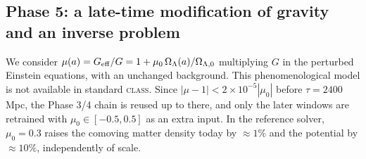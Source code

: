 \subsection{Phase 5: a late-time modification of gravity and an inverse problem}\label{sec:phase5}
We consider $\mu(a)=G_{\rm eff}/G=1+\mu_0\,\Omega_\Lambda(a)/\Omega_{\Lambda,0}$ multiplying $G$ in the perturbed Einstein equations, with an unchanged background. This phenomenological model is not available in standard \textsc{class}. Since $|\mu-1|<2\times10^{-5}|\mu_0|$ before $\tau=2400$\,Mpc, the Phase 3/4 chain is reused up to there, and only the later windows are retrained with $\mu_0\in[-0.5,0.5]$ as an extra input. In the reference solver, $\mu_0=0.3$ raises the comoving matter density today by $\approx1\%$ and the potential by $\approx10\%$, independently of scale. 
